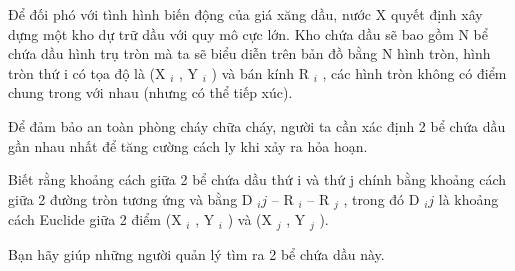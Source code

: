 Để đối phó với tình hình biến động của giá xăng dầu, nước X quyết định xây dựng một kho dự trữ dầu với quy mô cực lớn. Kho chứa dầu sẽ bao gồm N bể chứa dầu hình trụ tròn mà ta sẽ biểu diễn trên bản đồ bằng N hình tròn, hình tròn thứ i có tọa độ là (X   $_    i   $   , Y   $_    i   $   ) và bán kính R   $_    i   $   , các hình tròn không có điểm chung trong với nhau (nhưng có thể tiếp xúc).  

   Để đảm bảo an toàn phòng cháy chữa cháy, người ta cần xác định 2 bể chứa dầu gần nhau nhất để tăng cường cách ly khi xảy ra hỏa hoạn.  

   Biết rằng khoảng cách giữa 2 bể chứa dầu thứ i và thứ j chính bằng khoảng cách giữa 2 đường tròn tương ứng và bằng D   $_    ij   $   – R   $_    i   $   – R   $_    j   $   , trong đó D   $_    ij   $   là khoảng cách Euclide giữa 2 điểm (X   $_    i   $   , Y   $_    i   $   ) và (X   $_    j   $   , Y   $_    j   $   ).  

   Bạn hãy giúp những người quản lý tìm ra 2 bể chứa dầu này.  

\